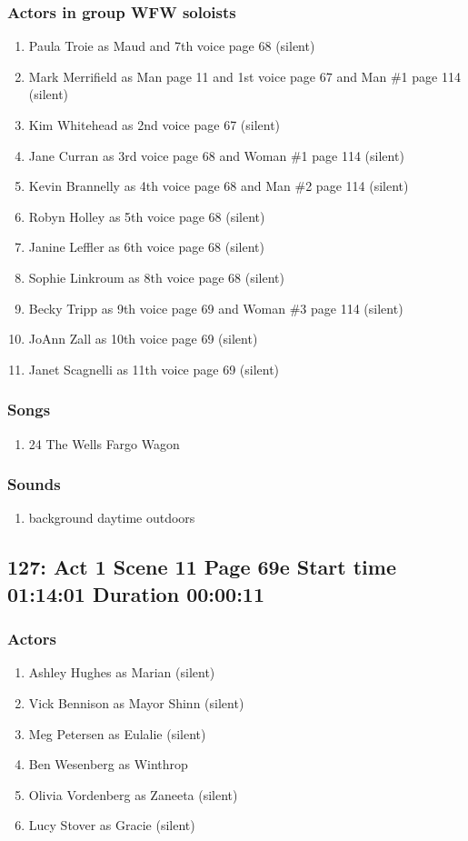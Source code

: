 \subsubsection{Actors in group WFW soloists}
\begin{enumerate}
\item Paula Troie as Maud and 7th voice page 68 (silent)
\item Mark Merrifield as Man page 11 and 1st voice page 67 and Man \#1 page 114 (silent)
\item Kim Whitehead as 2nd voice page 67 (silent)
\item Jane Curran as 3rd voice page 68 and Woman \#1 page 114 (silent)
\item Kevin Brannelly as 4th voice page 68 and Man \#2 page 114 (silent)
\item Robyn Holley as 5th voice page 68 (silent)
\item Janine Leffler as 6th voice page 68 (silent)
\item Sophie Linkroum as 8th voice page 68 (silent)
\item Becky Tripp as 9th voice page 69 and Woman \#3 page 114 (silent)
\item JoAnn Zall as 10th voice page 69 (silent)
\item Janet Scagnelli as 11th voice page 69 (silent)
\end{enumerate}

\subsubsection{Songs}
\begin{enumerate}
\item 24 The Wells Fargo Wagon
\end{enumerate}\subsubsection{Sounds}
\begin{enumerate}
\item background daytime outdoors
\end{enumerate}
\subsection{127: Act 1 Scene 11 Page 69e Start time 01:14:01 Duration 00:00:11}

\subsubsection{Actors}
\begin{enumerate}
\item Ashley Hughes as Marian (silent)
\item Vick Bennison as Mayor Shinn (silent)
\item Meg Petersen as Eulalie (silent)
\item Ben Wesenberg as Winthrop
\item Olivia Vordenberg as Zaneeta (silent)
\item Lucy Stover as Gracie (silent)
\end{enumerate}
